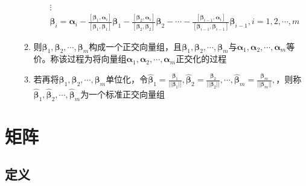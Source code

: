 \documentclass[12pt]{book}
\begin{document}
\begin{enumerate}[1.]
\begin{enumerate}[(1)]
\begin{align*}
                        &\vdots                                                                                                                                                                                              \\
                        &\bm{\beta}_i = \bm{\alpha}_i - \frac{[\bm{\beta}_{1},\bm{\alpha}_i]}{[\bm{\beta}_1,\bm{\beta}_1]}\bm{\beta}_{1} -  \frac{[\bm{\beta}_{2},\bm{\alpha}_i]}{[\bm{\beta}_2,\bm{\beta}_2]}\bm{\beta}_{2} - \cdots - \frac{[\bm{\beta}_{i-1},\bm{\alpha}_i]}{[\bm{\beta}_{i-1},\bm{\beta}_{i-1}]}\bm{\beta}_{i-1} , i=1,2,\cdots,m
                    \end{align*}
              \item 则$\bm{\beta}_{1},\bm{\beta}_{2},\cdots,\bm{\beta}_{m}$构成一个正交向量组，且$\bm{\beta}_{1},\bm{\beta}_{2},\cdots,\bm{\beta}_{m}$与$\bm{\alpha}_{1},\bm{\alpha}_{2},\cdots,\bm{\alpha}_{m}$等价。称该过程为将向量组$\bm{\alpha}_{1},\bm{\alpha}_{2},\cdots,\bm{\alpha}_{m}$正交化的过程
              \item 若再将$\bm{\beta}_{1},\bm{\beta}_{2},\cdots,\bm{\beta}_{m}$单位化，令$\hat{\bm{\beta}}_{1}=\frac{\bm{\beta}_1}{||\bm{\beta}_1||}, \hat{\bm{\beta}}_{2}=\frac{\bm{\beta}_2}{||\bm{\beta}_2||}, \cdots, \hat{\bm{\beta}}_{m}=\frac{\bm{\beta}_m}{||\bm{\beta}_m||},$，则称$\hat{\bm{\beta}}_{1}, \hat{\bm{\beta}}_{2}, \cdots, \hat{\bm{\beta}}_{m}$为一个标准正交向量组
          \end{enumerate}
\end{enumerate}



\section{矩阵}


\subsection{定义}
\end{document}
